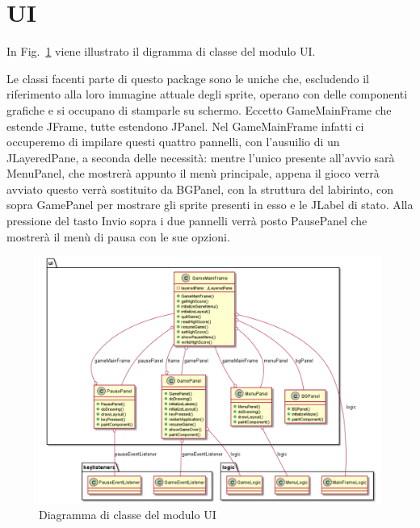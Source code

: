 \documentclass[12pt,a4paper]{report}
\begin{document}

\section{UI}\label{se:arch.ui}
In Fig.~\ref{fig:ui} viene illustrato il digramma di classe del modulo UI.\newline

Le classi facenti parte di questo package sono le uniche che, escludendo il riferimento alla loro immagine attuale degli sprite, operano con delle componenti grafiche e si occupano di stamparle su schermo. Eccetto GameMainFrame che estende JFrame, tutte estendono JPanel. Nel GameMainFrame infatti ci occuperemo di impilare questi quattro pannelli, con l’ausuilio di un JLayeredPane, a seconda delle necessità: mentre l’unico presente all’avvio sarà MenuPanel, che mostrerà appunto il menù principale, appena il gioco verrà avviato questo verrà sostituito da BGPanel, con la struttura del labirinto, con sopra GamePanel per mostrare gli sprite presenti in esso e le JLabel di stato. Alla pressione del tasto Invio sopra i due pannelli verrà posto PausePanel che mostrerà il menù di pausa con le sue opzioni.

\begin{figure}[tb]
  \includegraphics[width=\linewidth]{ui}
  \caption{Diagramma di classe del modulo UI}
  \label{fig:ui}
\end{figure}

\end{document}
